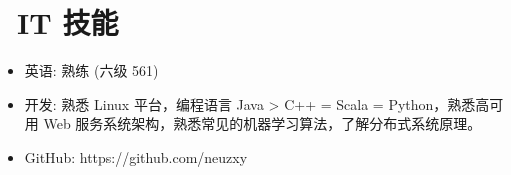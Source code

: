 \documentclass{resume}
\begin{document}
\section{\faCogs\ IT 技能}
\begin{itemize}[parsep=0.5ex]
  \item 英语: 熟练 (六级 561)
  \item 开发: 熟悉 Linux 平台，编程语言 Java > C++ = Scala = Python，熟悉高可用 Web 服务系统架构，熟悉常见的机器学习算法，了解分布式系统原理。
  \item GitHub: https://github.com/neuzxy
\end{itemize}

%

%
%
\end{document}
